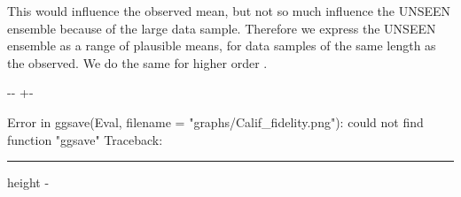 \documentclass[letterpaper,10pt,english]{sphinxmanual}
\newlength\nbsphinxcodecellspacing
\begin{document}
This would influence the observed mean, but not so much influence the UNSEEN ensemble because of the large data sample. Therefore we express the UNSEEN ensemble as a range of plausible means, for data samples of the same length as the observed. We do the same for higher order .

{
\begin{sphinxVerbatim}[commandchars=\\\{\}]
\llap{\color{nbsphinxin}[7]:\,\hspace{\fboxrule}\hspace{\fboxsep}}  
      
      
      
      
      

   

\end{sphinxVerbatim}
}

{

\kern-\sphinxverbatimsmallskipamount\kern-\baselineskip
\kern+\FrameHeightAdjust\kern-\fboxrule
\vspace{\nbsphinxcodecellspacing}

\begin{sphinxVerbatim}[commandchars=\\\{\}]
Error in ggsave(Eval, filename = "graphs/Calif\_fidelity.png"): could not find function "ggsave"
Traceback:

\end{sphinxVerbatim}
}

\hrule height -\fboxrule\relax
\vspace{\nbsphinxcodecellspacing}

\makeatletter\setbox\nbsphinxpromptbox\box\voidb@x\makeatother
\end{document}
